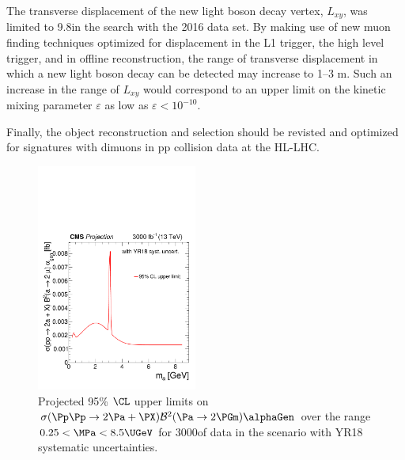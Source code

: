 The transverse displacement of the new light boson decay vertex, $L_{xy}$, was limited to 9.8\Ucm in the search with the 2016 data set. By making use of new muon finding techniques optimized for displacement in the L1 trigger, the high level trigger, and in offline reconstruction, the range of transverse displacement in which a new light boson decay can be detected may increase to {1--3 m}. %
Such an increase in the range of $L_{xy}$ would correspond to an upper limit on the kinetic mixing parameter $\varepsilon$ as low as $\varepsilon<10^{-10}$.

Finally, the object reconstruction and selection should be revisted and optimized for signatures with dimuons in pp collision data at the HL-LHC.

\begin{figure}
\centering
\includegraphics[width=0.47\textwidth]{section9/cms_higgs2a4mu/plots/nmssm_plots_scenario_2/limit_CSxBR2xAlpha_fb_vs_mGammaD_3000.pdf}
\caption{Projected 95\% $\CL$ upper limits on ${\sigma(\Pp\Pp \to 2 \Pa + \PX)  \mathcal{B}^2 (\Pa \to 2\PGm)  \alphaGen}$ over the range ${0.25 < \MPa < 8.5\UGeV}$ for 3000\Uifb of data in the scenario with YR18 systematic uncertainties.}
\label{fig:my_label1}
\end{figure}

